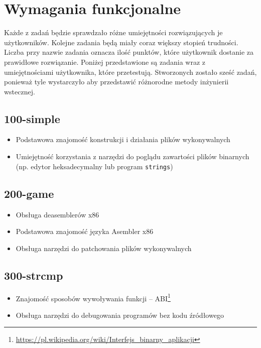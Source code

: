 \documentclass[language=polish,type=eng]{aghmodern}
\begin{document}
\section{Wymagania funkcjonalne}

Każde z zadań będzie sprawdzało różne umiejętności rozwiązujących je użytkowników.
Kolejne zadania będą miały coraz większy stopień trudności. Liczba przy nazwie zadania
oznacza ilość punktów, które użytkownik dostanie za prawidłowe rozwiązanie.
Poniżej przedstawione są zadania wraz z umiejętnościami użytkownika,
które przetestują. Stworzonych zostało sześć zadań, ponieważ tyle wystarczyło
aby przedstawić różnorodne metody inżynierii wstecznej.

\subsection{100-simple}
\begin{itemize}
    \item Podstawowa znajomość konstrukcji i działania plików wykonywalnych
    \item Umiejętność korzystania z narzędzi do poglądu zawartości plików binarnych
    (np. edytor heksadecymalny lub program \texttt{strings})
\end{itemize}

\subsection{200-game}

\begin{itemize}
    \item Obsługa deasemblerów x86
    \item Podstawowa znajomość języka Asembler x86
    \item Obsługa narzędzi do patchowania plików wykonywalnych
\end{itemize}

\subsection{300-strcmp}

\begin{itemize}
    \item Znajomość sposobów wywoływania funkcji -- ABI\footnote{
    \url{https://pl.wikipedia.org/wiki/Interfejs_binarny_aplikacji}}
    \item Obsługa narzędzi do debugowania programów bez kodu źródłowego
\end{itemize}
\end{document}
